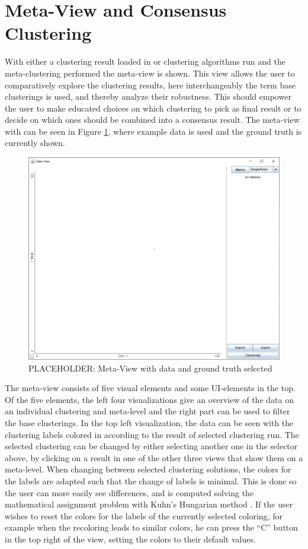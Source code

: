 \documentclass[
	a4paper,
	english,
	twoside,
	openright,               
	11pt                            
	]{report}
\begin{document}
\section{Meta-View and Consensus Clustering}
With either a clustering result loaded in or clustering algorithms run and the meta-clustering performed the meta-view is shown. This view allows the user to comparatively explore the clustering results, here interchangeably the term base clusterings is used, and thereby analyze their robustness. This should empower the user to make educated choices on which clustering to pick as final result or to decide on which ones should be combined into a consensus result. The meta-view with can be seen in Figure \ref{fig:meta-view}, where example data is used and the ground truth is currently shown.

\begin{figure}[h]
	\centering
	\includegraphics[scale=.45]{data-view}
	\caption{PLACEHOLDER: Meta-View with data and ground truth selected}
	\label{fig:meta-view}
\end{figure}

The meta-view consists of five visual elements and some UI-elements in the top. Of the five elements, the left four visualizations give an overview of the data on an individual clustering and meta-level and the right part can be used to filter the base clusterings. In the top left visualization, the data can be seen with the clustering labels colored in according to the result of selected clustering run. The selected clustering can be changed by either selecting another one in the selector above, by clicking on a result in one of the other three views that  show them on a meta-level. When changing between selected clustering solutions, the colors for the labels are adapted such that the change of labels is minimal. This is done so the user can more easily see differences, and is computed solving the mathematical assignment problem with Kuhn’s Hungarian method \cite{Kuhn2010}. If the user wishes to reset the colors for the labels of the currently selected coloring, for example when the recoloring leads to similar colors, he can press the ``C'' button in the top right of the view, setting the colors to their default values.
\end{document}
